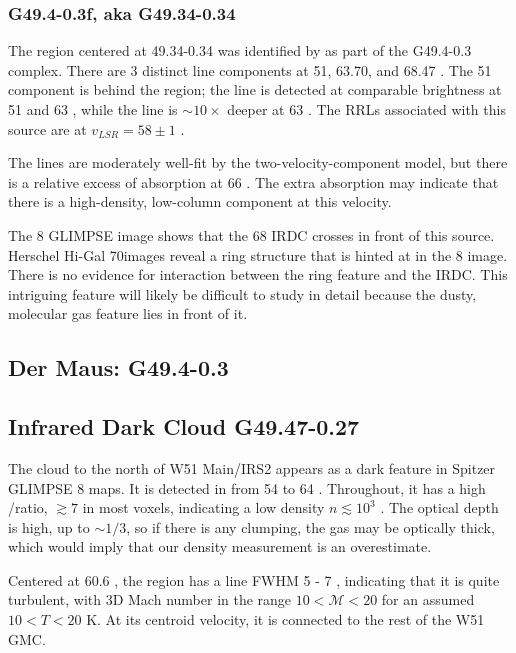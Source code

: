 \subsubsection{G49.4-0.3f, aka G49.34-0.34}
The \hii region centered at 49.34-0.34 was identified by \citet{Mehringer1994a}
as part of the G49.4-0.3 complex.  There are 3 distinct \formaldehyde line
components at 51, 63.70, and 68.47 \kms.  The 51 \kms component is behind the \hii
region; the \thirteenco line is detected at comparable brightness at 51 \kms
and 63 \kms, while the \formaldehyde \oneone line is $\sim10\times$ deeper at
63 \kms.  The RRLs associated with this source are at $v_{LSR}=58 \pm 1$ \kms.

The \formaldehyde lines are moderately well-fit by the two-velocity-component
model, but there is a relative excess of \twotwo absorption at 66 \kms.  The
extra absorption may indicate that there is a high-density, low-column
component at this velocity.

The 8 \um GLIMPSE image shows that the 68 \kms IRDC crosses in front of this
source.  Herschel Hi-Gal 70\um images reveal a ring structure that is hinted at
in the 8 \um image.  There is no evidence for interaction between the ring
feature and the IRDC.  This intriguing feature will likely be difficult to
study in detail because the dusty, molecular gas feature lies in front of it.

\subsection{Der Maus: G49.4-0.3}

\subsection{Infrared Dark Cloud G49.47-0.27}
The cloud to the north of W51 Main/IRS2 appears as a dark feature in Spitzer
GLIMPSE 8 \um maps.  It is detected in \formaldehyde from 54 to 64
\kms.  Throughout, it has a high \oneone/\twotwo ratio, $\gtrsim7$ in
most voxels, indicating a low density $n\lesssim10^3$ \percc.  The \oneone
optical depth is high, up to $\sim1/3$, so if there is any clumping, the gas
may be optically thick, which would imply that our density measurement is an
overestimate.

Centered at 60.6 \kms, the region has a line FWHM 5 - 7 \kms, indicating that
it is quite turbulent, with 3D Mach number in the range $10 < \mathcal{M} < 20$
for an assumed $10 < T < 20$ K.  At its centroid velocity, it is connected
to the rest of the W51 GMC.

